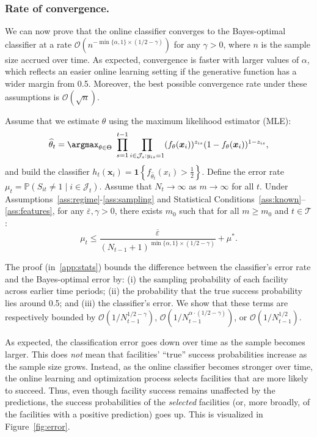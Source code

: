 \documentclass[nonblindrev]{informs3noheader}
\def\P{\mathbb{P}}
\def\calJ{\mathcal{J}}
\def\calO{\mathcal{O}}
\def\calT{\mathcal{T}}
\def\bx{\boldsymbol{x}}
\begin{document}
\subsubsection*{Rate of convergence.}
We can now prove that the online classifier converges to the Bayes-optimal classifier at a rate $\calO(n^{-\min\{\alpha,1\}\times (1/2-\gamma)})$ for any $\gamma>0$, where $n$ is the sample size accrued over time. As expected, convergence is faster with larger values of $\alpha$, which reflects an easier online learning setting if the generative function has a wider margin from 0.5. Moreover, the best possible convergence rate under these assumptions is $\calO(\sqrt n)$.
\begin{proposition}\label{prop:MLE}
       Assume that we estimate $\theta$ using the maximum likelihood estimator (MLE):
    \begin{equation}
        \widehat{\theta}_t= \argmax_{\theta\in\Theta} \ \prod_{s=1}^{t-1} \prod_{i\in\calJ_s:y_{is}=1} (f_\theta(\bx_{i}))^{z_{is}}(1-f_\theta(\bx_{i}))^{1-z_{is}}, \label{eq:mle_estimation}
    \end{equation}
    and build the classifier
    $h_t(\bx_{i}) = \mathbf{1}\left\{f_{\widehat{\theta}_t}(x_{i})>\frac{1}{2}\right\}$. Define the error rate $\mu_t = \P(S_{it}\neq 1 \mid i\in\calJ_t)$. Assume that $N_t \to \infty$ as $m \to \infty$ for all $t$. Under Assumptions~\ref{ass:regime}-\ref{ass:sampling} and Statistical Conditions~\ref{ass:known}--\ref{ass:features}, for any $\overline\varepsilon,\gamma>0$, there exists $m_0$ such that for all $m\geq m_0$ and $t\in\calT$:
    \[\mu_t \leq \frac{\overline\varepsilon}{(N_{t-1}+1)^{\min\{\alpha,1\}\times (1/2-\gamma)}}+\mu^*.\]
\end{proposition}

The proof (in~\ref{app:stats}) bounds the difference between the classifier's error rate and the Bayes-optimal error by: (i) the sampling probability of each facility across earlier time periods; (ii) the probability that the true success probability lies around 0.5; and (iii) the classifier's error. We show that these terms are respectively bounded by $\calO(1/N_{t-1}^{1/2-\gamma})$, $\calO(1/N_{t-1}^{\alpha\cdot(1/2-\gamma)})$, or $\calO(1/N_{t-1}^{1/2})$.

As expected, the classification error goes down over time as the sample becomes larger. This does \textit{not} mean that facilities' ``true'' success probabilities increase as the sample size grows. Instead, as the online classifier becomes stronger over time, the online learning and optimization process selects facilities that are more likely to succeed. Thus, even though facility success remains unaffected by the predictions, the success probabilities of the \textit{selected} facilities (or, more broadly, of the facilities with a positive prediction) goes up. This is visualized in Figure~\ref{fig:error}.
\end{document}
